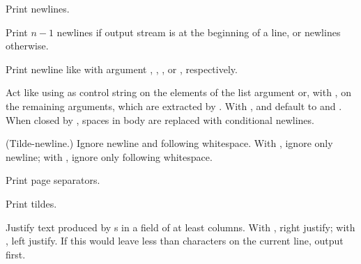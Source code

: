 \begin{LIST}{1cm}
\begin{LIST}{.5cm}
    {
    Print  newlines.
  }

    {
    Print $n-1$ newlines if output stream is at the
    beginning of a line, or  newlines otherwise.
  }

    {
    Print newline like  with argument
    , , , or , respectively.
  }

  {
  Act like  using  as 
  control string on the elements of the list argument or, with ,
  on the remaining arguments, which are extracted by
  . With \KWD{:},  and 
  default to \LIT{(} and \LIT{)}. When closed by
  , spaces in body are replaced with
  conditional newlines. 
  }

    {
    (Tilde-newline.) Ignore newline and following
    whitespace. With \kwd{:}, ignore only newline; with ,
    ignore only following whitespace.
  }

    {
    Print  page separators.
  }

    {
    Print  tildes.
  }

    {
    Justify text produced by s in a field of at least
     columns. With \kwd{:}, right justify; with ,
    left justify. If this would leave less than  characters
    on the current line, output  first.
  }


\end{LIST}
\end{LIST}
